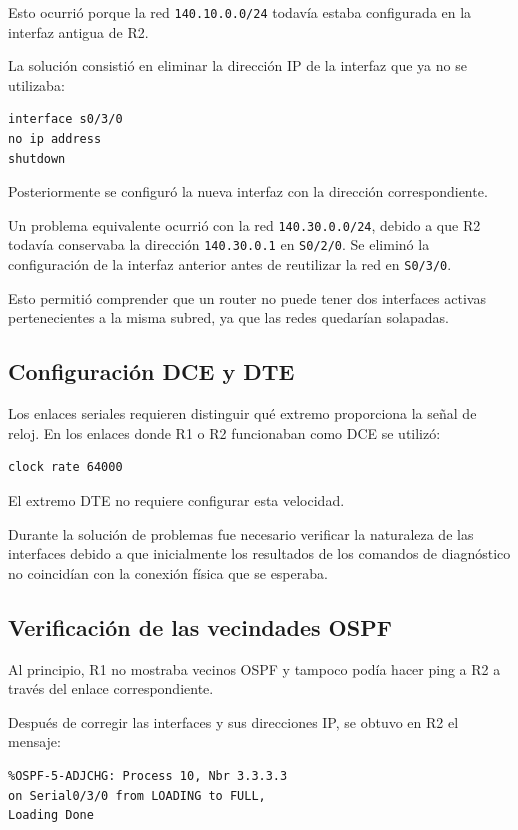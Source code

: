 \documentclass[12pt,a4paper]{article}
\begin{document}
Esto ocurrió porque la red \texttt{140.10.0.0/24} todavía estaba configurada en la interfaz antigua de R2.

La solución consistió en eliminar la dirección IP de la interfaz que ya no se utilizaba:

\begin{lstlisting}[style=cisco]
interface s0/3/0
no ip address
shutdown
\end{lstlisting}

Posteriormente se configuró la nueva interfaz con la dirección correspondiente.

Un problema equivalente ocurrió con la red \texttt{140.30.0.0/24}, debido a que R2 todavía conservaba la dirección \texttt{140.30.0.1} en \texttt{S0/2/0}. Se eliminó la configuración de la interfaz anterior antes de reutilizar la red en \texttt{S0/3/0}.

Esto permitió comprender que un router no puede tener dos interfaces activas pertenecientes a la misma subred, ya que las redes quedarían solapadas.

\subsection{Configuración DCE y DTE}

Los enlaces seriales requieren distinguir qué extremo proporciona la señal de reloj. En los enlaces donde R1 o R2 funcionaban como DCE se utilizó:

\begin{lstlisting}[style=cisco]
clock rate 64000
\end{lstlisting}

El extremo DTE no requiere configurar esta velocidad.

Durante la solución de problemas fue necesario verificar la naturaleza de las interfaces debido a que inicialmente los resultados de los comandos de diagnóstico no coincidían con la conexión física que se esperaba.

\subsection{Verificación de las vecindades OSPF}

Al principio, R1 no mostraba vecinos OSPF y tampoco podía hacer ping a R2 a través del enlace correspondiente.

Después de corregir las interfaces y sus direcciones IP, se obtuvo en R2 el mensaje:

\begin{verbatim}
%OSPF-5-ADJCHG: Process 10, Nbr 3.3.3.3
on Serial0/3/0 from LOADING to FULL,
Loading Done
\end{verbatim}
\end{document}
